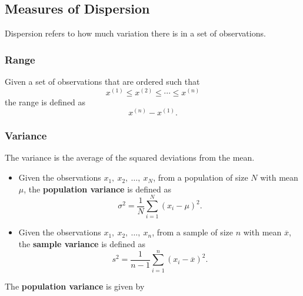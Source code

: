 \documentclass{article}
\begin{document}
\subsection{Measures of Dispersion}
Dispersion refers to how much variation there is in a set of
observations.
\subsubsection{Range}
Given a set of observations that are ordered such that
\begin{equation*}
    x^{\left( 1 \right)} \leq x^{\left( 2 \right)} \leq \cdots \leq x^{\left( n \right)}
\end{equation*}
the range is defined as
\begin{equation*}
    x^{\left( n \right)} - x^{\left( 1 \right)}.
\end{equation*}
\subsubsection{Variance}
The variance is the average of the squared deviations from the mean.
\begin{itemize}
    \item Given the observations \(x_1,\: x_2,\: \ldots,\: x_N\), from
          a population of size \(N\) with mean \(\mu\), the
          \textbf{population variance} is defined as
          \begin{equation*}
              \sigma^2 = \frac{1}{N} \sum_{i = 1}^N \left( x_i - \mu \right)^2.
          \end{equation*}
    \item Given the observations \(x_1,\: x_2,\: \ldots,\: x_n\), from
          a sample of size \(n\) with mean \(\overline{x}\), the
          \textbf{sample variance} is defined as
          \begin{equation*}
              s^2 = \frac{1}{n - 1} \sum_{i = 1}^n \left( x_i - \overline{x} \right)^2.
          \end{equation*}
\end{itemize}
The \textbf{population variance} is given by
\end{document}
